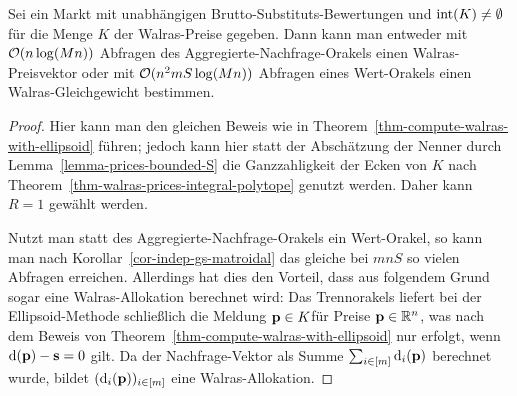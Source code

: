 \begin{theorem}
	Sei ein Markt mit unabhängigen Brutto-Substituts-Bewertungen und $\operatorname{int}(K)\neq \emptyset$ für die Menge $K$ der Walras-Preise gegeben.
	Dann kann man entweder mit $\mathcal{O}(n\log(Mn))$ Abfragen des Aggregierte-Nachfrage-Orakels einen Walras-Preisvektor oder mit $\mathcal{O}(n^2 m S\log(Mn))$ Abfragen eines Wert-Orakels einen Walras-Gleichgewicht bestimmen.
\end{theorem}
\begin{proof}
	Hier kann man den gleichen Beweis wie in Theorem~\ref{thm-compute-walras-with-ellipsoid} führen; jedoch kann hier statt der Abschätzung der Nenner durch Lemma~\ref{lemma-prices-bounded-S} die Ganzzahligkeit der Ecken von $K$ nach Theorem~\ref{thm-walras-prices-integral-polytope} genutzt werden.
	Daher kann $R=1$ gewählt werden.
	
	Nutzt man statt des Aggregierte-Nachfrage-Orakels ein Wert-Orakel, so kann man nach Korollar~\ref{cor-indep-gs-matroidal} das gleiche bei $mnS$ so vielen Abfragen erreichen.
	Allerdings hat dies den Vorteil, dass aus folgendem Grund sogar eine Walras-Allokation berechnet wird:
	Das Trennorakels liefert bei der Ellipsoid-Methode schließlich die Meldung \glqq$\mathbf{p}\in K$\grqq für Preise $\mathbf{p}\in\mathbb{R}^n$, was nach dem Beweis von Theorem~\ref{thm-compute-walras-with-ellipsoid} nur erfolgt, wenn $\operatorname{d}(\mathbf{p}) - \mathbf{s} = 0$ gilt.
	Da der Nachfrage-Vektor als Summe $\sum_{i\in\left[ m \right]} \operatorname{d}_i(\mathbf{p})$ berechnet wurde, bildet $(\operatorname{d}_i(\mathbf{p}))_{i\in\left[ m \right]}$ eine Walras-Allokation.
\end{proof}